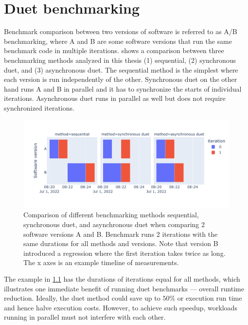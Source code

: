 \chapter{Duet benchmarking}
\label{chap:duet}

Benchmark comparison between two versions of software is referred to as A/B benchmarking, where A and B are some software versions that run the same benchmark code in multiple iterations.
 shows a comparison between three benchmarking methods analyzed in this thesis (1) sequential, (2) synchronous duet, and (3) asynchronous duet.
The sequential method is the simplest where each version is run independently of the other.
Synchronous duet on the other hand runs A and B in parallel and it has to synchronize the starts of individual iterations.
Asynchronous duet runs in parallel as well but does not require synchronized iterations.

\begin{figure}
	\centering
	\includegraphics[width=.9\linewidth]{./figures/method_timeline.pdf}
	\caption{
	Comparison of different benchmarking methods sequential, synchronous duet, and asynchronous duet when comparing 2 software versions A and B.
	Benchmark runs 2 iterations with the same durations for all methods and versions.
	Note that version B introduced a regression where the first iteration takes twice as long.
	The x axes is an example timeline of measurements.
	}
	\label{fig:method_timeline}
\end{figure}

The example in \cref{fig:method_timeline} has the durations of iterations equal for all methods, which illustrates one immediate benefit of running duet benchmarks --- overall runtime reduction.
Ideally, the duet method could save up to $50\%$ or execution run time and hence halve execution costs.
However, to achieve such speedup, workloads running in parallel must not interfere with each other.


